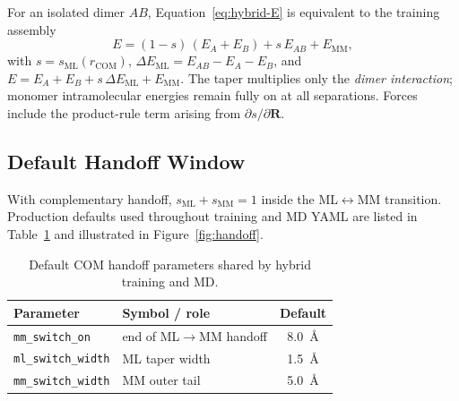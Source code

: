 \documentclass[journal=jctc,manuscript=article]{achemso}
\begin{document}
For an isolated dimer \(AB\), Equation~\ref{eq:hybrid-E} is equivalent to the
training assembly
\begin{equation}
\label{eq:dimer-train}
E = (1-s)\,(E_A+E_B) + s\,E_{AB} + E_{\mathrm{MM}},
\end{equation}
with \(s=s_{\mathrm{ML}}(r_{\mathrm{COM}})\),
\(\Delta E_{\mathrm{ML}}=E_{AB}-E_A-E_B\), and
\(E=E_A+E_B+s\,\Delta E_{\mathrm{ML}}+E_{\mathrm{MM}}\).
The taper multiplies only the \emph{dimer interaction}; monomer intramolecular
energies remain fully on at all separations. Forces include the product-rule
term arising from \(\partial s/\partial\mathbf{R}\).

\subsection{Default Handoff Window}

With complementary handoff, \(s_{\mathrm{ML}}+s_{\mathrm{MM}}=1\) inside the
ML\(\leftrightarrow\)MM transition. Production defaults used throughout training
and MD YAML are listed in Table~\ref{tab:cutoffs} and illustrated in
Figure~\ref{fig:handoff}.

\begin{table}[h]
\caption{Default COM handoff parameters shared by hybrid training and MD.}
\label{tab:cutoffs}
\begin{tabular}{llc}
\toprule
Parameter & Symbol / role & Default \\
\midrule
\texttt{mm\_switch\_on} & end of ML\(\to\)MM handoff & \SI{8.0}{\angstrom} \\
\texttt{ml\_switch\_width} & ML taper width & \SI{1.5}{\angstrom} \\
\texttt{mm\_switch\_width} & MM outer tail & \SI{5.0}{\angstrom} \\
\bottomrule
\end{tabular}
\end{table}
\end{document}
